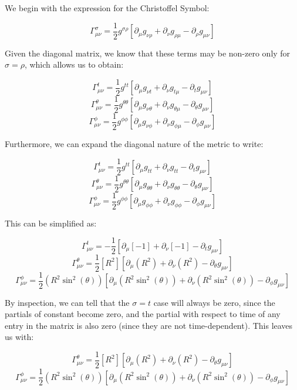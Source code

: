 \begin{enumerate}
\begin{enumerate}
        We begin with the expression for the Christoffel Symbol:

          $$\Gamma^{\sigma}_{\mu\nu}=\frac{1}{2}g^{\sigma\rho}\left[ \partial_{\mu}g_{\nu\rho}+\partial_{\nu}g_{\rho\mu}-\partial_{\rho}g_{\mu\nu}  \right]$$

        Given the diagonal matrix, we know that these terms may be non-zero only for $\sigma=\rho$, which allows us to obtain:

          $$\Gamma^{t}_{\mu\nu}=\frac{1}{2}g^{tt}\left[ \partial_{\mu}g_{\nu t}+\partial_{\nu}g_{t\mu}-\partial_{t}g_{\mu\nu}  \right]$$
          $$\Gamma^{\theta}_{\mu\nu}=\frac{1}{2}g^{\theta\theta}\left[ \partial_{\mu}g_{\nu\theta}+\partial_{\nu}g_{\theta\mu}-\partial_{\theta}g_{\mu\nu}  \right]$$
          $$\Gamma^{\phi}_{\mu\nu}=\frac{1}{2}g^{\phi\phi}\left[ \partial_{\mu}g_{\nu\phi}+\partial_{\nu}g_{\phi\mu}-\partial_{\phi}g_{\mu\nu}  \right]$$

          Furthermore, we can expand the diagonal nature of the metric to write:

          $$\Gamma^{t}_{\mu\nu}=\frac{1}{2}g^{tt}\left[ \partial_{\mu}g_{tt}+\partial_{\nu}g_{tt}-\partial_{t}g_{\mu\nu}  \right]$$
          $$\Gamma^{\theta}_{\mu\nu}=\frac{1}{2}g^{\theta\theta}\left[ \partial_{\mu}g_{\theta\theta}+\partial_{\nu}g_{\theta\theta}-\partial_{\theta}g_{\mu\nu}  \right]$$
          $$\Gamma^{\phi}_{\mu\nu}=\frac{1}{2}g^{\phi\phi}\left[ \partial_{\mu}g_{\phi\phi}+\partial_{\nu}g_{\phi\phi}-\partial_{\phi}g_{\mu\nu}  \right]$$

          This can be simplified as:

          $$\Gamma^{t}_{\mu\nu}=-\frac{1}{2}\left[ \partial_{\mu}[-1]+\partial_{\nu}[-1]-\partial_{t}g_{\mu\nu}  \right]$$
          $$\Gamma^{\theta}_{\mu\nu}=\frac{1}{2}\left[ R^2 \right]\left[ \partial_{\mu}(R^2)+\partial_{\nu}(R^2)-\partial_{\theta}g_{\mu\nu}  \right]$$
          $$\Gamma^{\phi}_{\mu\nu}=\frac{1}{2}(R^2\sin^2(\theta))\left[ \partial_{\mu}(R^2\sin^2(\theta))+\partial_{\nu}(R^2\sin^2(\theta))-\partial_{\phi}g_{\mu\nu}  \right]$$

          By inspection, we can tell that the $\sigma=t$ case will always be zero, since the partials of constant become zero, and the partial with respect to time of any entry in the matrix is also zero (since they are not time-dependent). This leaves us with:

          $$\Gamma^{\theta}_{\mu\nu}=\frac{1}{2}\left[ R^2 \right]\left[ \partial_{\mu}(R^2)+\partial_{\nu}(R^2)-\partial_{\theta}g_{\mu\nu}  \right]$$
          $$\Gamma^{\phi}_{\mu\nu}=\frac{1}{2}(R^2\sin^2(\theta))\left[ \partial_{\mu}(R^2\sin^2(\theta))+\partial_{\nu}(R^2\sin^2(\theta))-\partial_{\phi}g_{\mu\nu}  \right]$$


\end{enumerate}
\end{enumerate}
